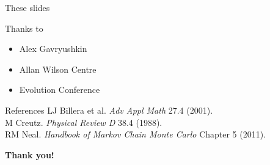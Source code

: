 \documentclass{beamer}
\begin{document}
\begin{frame}
  \begin{block}{These slides}
    \large \texttt{}
  \end{block}
  \begin{block}{Thanks to}
    \begin{itemize}
      \item Alex Gavryushkin
      \item Allan Wilson Centre
      \item Evolution Conference
    \end{itemize}
  \end{block}
  \begin{block}{References}
    \footnotesize
    LJ Billera et al. \textit{Adv Appl Math} 27.4 (2001). \texttt{} \\
    M Creutz. \textit{Physical Review D} 38.4 (1988). \texttt{} \\
    RM Neal. \textit{Handbook of Markov Chain Monte Carlo} Chapter 5 (2011).
  \end{block}
  \vspace{24pt}
  \centering\Large\textbf{Thank you!}
\end{frame}
\end{document}
